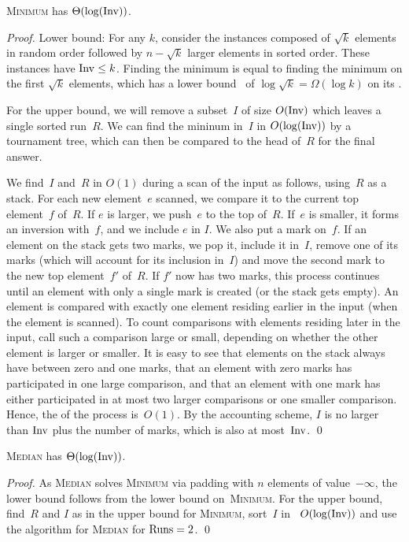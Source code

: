 \begin{theorem}
\textsc{Minimum} has \frag $\Theta(\log (\mathrm{Inv}))$.
\end{theorem}
\begin{proof}
Lower bound: For any $k$, consider the instances composed of
$\sqrt{k}$ elements in random order followed by $n - \sqrt{k}$
larger elements in sorted order. These instances have $\mathrm{Inv} \le
k$. Finding the minimum is equal to finding the minimum on the first
$\sqrt{k}$ elements, which has a lower
bound~\cite{afshani:fragile-ESA19} of
$\log \sqrt{k} = \Omega(\log k)$ on its \frag.

For the upper bound, we will remove a subset~$I$ of size $O(\mathrm{Inv})$
which leaves a single sorted run~$R$. We can find the mininum in~$I$
in $O(\log(\mathrm{Inv}))$ \frag by a tournament tree, which can then be
compared to the head of~$R$ for the final answer.

We find~$I$ and~$R$ in $O(1)$ \frag during a scan of the input as
follows, using~$R$ as a stack. For each new element~$e$ scanned, we
compare it to the current top element~$f$ of~$R$. If $e$ is larger, we
push~$e$ to the top of~$R$. If~$e$ is smaller, it forms an inversion
with~$f$, and we include $e$ in $I$. We also put a mark on~$f$. If an
element on the stack gets two marks, we pop it, include it in~$I$,
remove one of its marks (which will account for its inclusion in~$I$)
and move the second mark to the new top element~$f'$ of~$R$. If $f'$
now has two marks, this process continues until an element with only a
single mark is created (or the stack gets empty). An element is
compared with exactly one element residing earlier in the input (when
the element is scanned). To count comparisons with elements residing
later in the input, call such a comparison large or small, depending
on whether the other element is larger or smaller. It is easy to see
that elements on the stack always have between zero and one marks,
that an element with zero marks has participated in one large
comparison, and that an element with one mark has either participated
in at most two larger comparisons or one smaller comparison. Hence,
the \frag of the process is~$O(1)$. By the accounting scheme, $I$
is no larger than $\mathrm{Inv}$ plus the number of marks, which is also at
most~$\mathrm{Inv}$. \qed
\end{proof}

\begin{theorem}
\textsc{Median} has \frag $\Theta(\log (\mathrm{Inv}))$.
\end{theorem}
\begin{proof}
As \textsc{Median} solves \textsc{Minimum} via padding with $n$
elements of value~$-\infty$, the lower bound follows from the lower
bound on~\textsc{Minimum}. For the upper bound, find~$R$ and $I$ as in
the upper bound for \textsc{Minimum}, sort~$I$ in
\frag~$O(\log(\mathrm{Inv}))$ and use the algorithm for \textsc{Median}
for $\mathrm{Runs} = 2$. \qed
\end{proof}

